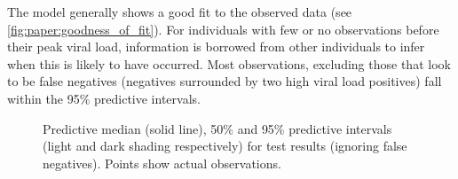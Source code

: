 \documentclass[thesis.tex]{subfiles}
\begin{document}
The model generally shows a good fit to the observed data (see \autoref{fig:paper:goodness_of_fit}).
For individuals with few or no observations before their peak viral load, information is borrowed from other individuals to infer when this is likely to have occurred.
Most observations, excluding those that look to be false negatives (negatives surrounded by two high viral load positives) fall within the 95\% predictive intervals.

\begin{figure}
    \centering
    \vspace*{-3cm}
    \caption{Predictive median (solid line), 50\% and 95\% predictive intervals (light and dark shading respectively) for test results (ignoring false negatives). Points show actual observations.}
    \label{fig:paper:goodness_of_fit}
\end{figure}
\end{document}
